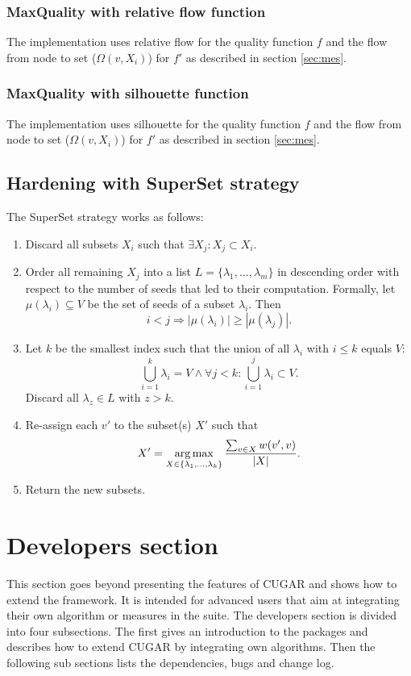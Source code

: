 \documentclass[a4paper, 11pt]{article}
\newcommand{\argmax}{\operatornamewithlimits{arg\,max}}
\begin{document}
	\subsubsection{MaxQuality with relative flow function}
		The implementation uses relative flow for the quality function $f$ and the flow from node to set ($\Omega (v,X_i)$) for $f'$ 
		as described in section \ref{sec:mes}.
	
	\subsubsection{MaxQuality with silhouette function}
		The implementation uses silhouette for the quality function $f$ and the flow from node to set ($\Omega (v,X_i)$) for $f'$ 
		as described in section \ref{sec:mes}.
		
	\subsection{Hardening with SuperSet strategy}
		The SuperSet strategy works as follows:

		\begin{enumerate}
			\item Discard all subsets $X_i$ such that $\exists X_j: X_j \subset X_i$.
			\item Order all remaining $X_j$ into a list $L = \{\lambda_1, ..., \lambda_m\}$ in descending order with respect to the number of seeds that led to their computation. Formally, let $\mu(\lambda_i) \subseteq V$ be the set of seeds of a subset $\lambda_i$. Then
				\[
				i < j \Rightarrow |\mu(\lambda_i)| \geq |\mu(\lambda_j)|.
				\]
			\item Let $k$ be the smallest index such that the union of all $\lambda_i$ with $i \leq k$ equals $V$:
				\[
				\bigcup\limits_{i=1}^{k} \lambda_i = V \wedge \forall j < k: \bigcup\limits_{i=1}^{j} \lambda_i \subset V.
				\]
				Discard all $\lambda_z \in L$ with $z > k$.
			\item Re-assign each $v'$ to the subset(s) $X'$ such that 
				\[
				X' = \argmax\limits_{X \in \{\lambda_1, ..., \lambda_k\}} \frac{\sum_{v \in X} w(v', v)}{|X|}.
				\]
			\item Return the new subsets.
		\end{enumerate}

\newpage
\section{Developers section}
	This section goes beyond presenting the features of CUGAR and shows how to extend the framework. 
	It is intended for advanced users that aim at integrating their own algorithm or measures in the suite. 
	The developers section is divided into four subsections.  
	The first gives an introduction to the packages and describes how to extend CUGAR by integrating own algorithms.
	Then the following sub sections lists the dependencies, bugs and change log.\\
	
\end{document}
